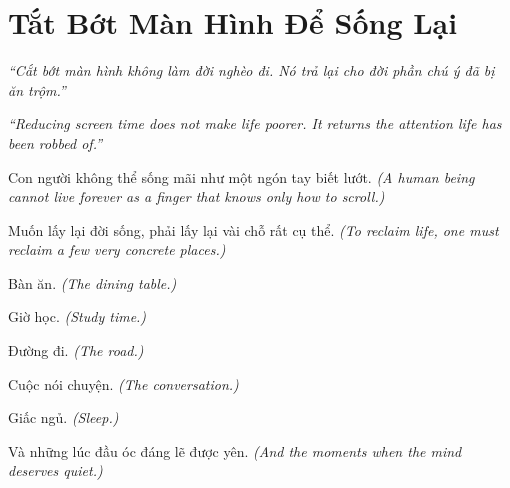 \chapter{Tắt Bớt Màn Hình Để Sống Lại}

\begin{center}
	\textit{\color{bookprimary}``Cắt bớt màn hình không làm đời nghèo đi. Nó trả lại cho đời phần chú ý đã bị ăn trộm.''}

	\textit{\color{bookprimary}``Reducing screen time does not make life poorer. It returns the attention life has been robbed of.''}
\end{center}

\ngancach

\begin{tcolorbox}[colback=bookprimary!6,colframe=bookprimary!35,arc=5pt,title={\bfseries Góc Suy Nghĩ},fonttitle=\bfseries\color{bookprimary}]
Con người không thể sống mãi như một ngón tay biết lướt.
\textit{(A human being cannot live forever as a finger that knows only how to scroll.)}

Muốn lấy lại đời sống, phải lấy lại vài chỗ rất cụ thể.
\textit{(To reclaim life, one must reclaim a few very concrete places.)}

Bàn ăn.
\textit{(The dining table.)}

Giờ học.
\textit{(Study time.)}

Đường đi.
\textit{(The road.)}

Cuộc nói chuyện.
\textit{(The conversation.)}

Giấc ngủ.
\textit{(Sleep.)}

Và những lúc đầu óc đáng lẽ được yên.
\textit{(And the moments when the mind deserves quiet.)}
\end{tcolorbox}

